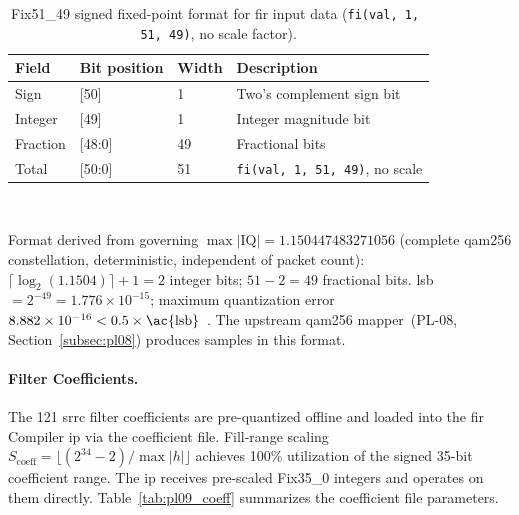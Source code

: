 \begin{table}[htbp]
  \caption{Fix51\_49 signed fixed-point format for \ac{fir} input data
           (\texttt{fi(val,\,1,\,51,\,49)}, no scale factor).}
  \label{tab:pl09_fix51}
  \centering
  \small
  \begin{tabular}{llll}
    \hline
    Field & Bit position & Width & Description \\
    \hline
    Sign     & {[50]}   & 1  & Two's complement sign bit \\[2pt]
    Integer  & {[49]}   & 1  & Integer magnitude bit \\[2pt]
    Fraction & {[48:0]} & 49 & Fractional bits \\
    \hline
    Total    & {[50:0]} & 51 & \texttt{fi(val,\,1,\,51,\,49)}, no scale \\
    \hline
  \end{tabular}\\[4pt]
  \begin{minipage}{\linewidth}
    \small
    Format derived from governing $\max|\text{IQ}| = 1.150447483271056$
    (complete \ac{qam256} constellation, deterministic, independent of packet
    count): $\lceil\log_2(1.1504)\rceil + 1 = 2$ integer bits;
    $51 - 2 = 49$ fractional bits.
    \ac{lsb}~$= 2^{-49} = 1.776\times10^{-15}$;
    maximum quantization error $8.882\times10^{-16} < 0.5\times\text{\ac{lsb}}$~\cite{ITU_J83}.
    The upstream \ac{qam256} mapper~(PL-08, Section~\ref{subsec:pl08})
    produces samples in this format.
  \end{minipage}
\end{table}



\FloatBarrier
\paragraph{Filter Coefficients.}

The 121 \ac{srrc} filter coefficients are pre-quantized offline and
loaded into the \ac{fir} Compiler \ac{ip} via the coefficient file.
Fill-range scaling $S_\text{coeff} = \lfloor (2^{34} - 2) / \max|h| \rfloor$
achieves 100\% utilization of the signed 35-bit coefficient range.
The \ac{ip} receives pre-scaled Fix35\_0 integers and operates on them
directly.
Table~\ref{tab:pl09_coeff} summarizes the coefficient file parameters.

